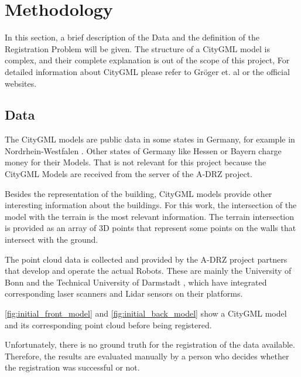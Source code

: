 

    \chapter{Methodology}
        In this section, a brief description of the Data and the definition of the Registration Problem will be given.
        The structure of a CityGML model is complex, and their complete explanation is out of the scope of this project,
        For detailed information about CityGML please refer to Gröger et. al \cite{Groger_2012_OGC} or the official websites.

    \section{Data}   
        The CityGML models are public data in some states in Germany, for example in Nordrhein-Westfalen \cite{NRW3DModel_online}. 
        Other states of Germany like Hessen \cite{Hessen3DModel_online} or Bayern \cite{Bayern3DModel_online} charge money for their Models.
        That is not relevant for this project because the CityGML Models are received from the server of the A-DRZ project.

        Besides the representation of the building, CityGML models provide other interesting information about the buildings.
        For this work, the intersection of the model with the terrain is the most relevant information.
        The terrain intersection is provided as an array of 3D points that represent some points on the walls that intersect with the
        ground. 
        
        The point cloud data is collected and provided by the A-DRZ project partners that develop and operate the actual Robots.
        These are mainly the University of Bonn \cite{UniBonn_online} and the Technical University of Darmstadt \cite{TUDarmstadt_online},
        which have integrated corresponding laser scanners and Lidar sensors on their platforms.

        \autoref{fig:initial_front_model} and \autoref{fig:initial_back_model} show a CityGML model and its corresponding point cloud
        before being registered.
            
        Unfortunately, there is no ground truth for the registration of the data available. 
        Therefore, the results are evaluated manually by a person who decides whether the registration was successful or not.

